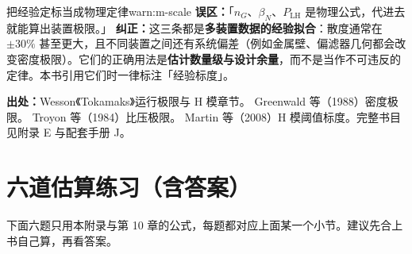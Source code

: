 \begin{warning}{把经验定标当成物理定律}{warn:m-scale}
\textbf{误区：}「$n_G$、$\beta_N$、$P_{\mathrm{LH}}$ 是物理公式，代进去就能算出装置极限。」
\textbf{纠正：}这三条都是\textbf{多装置数据的经验拟合}：散度通常在 $\pm30\%$ 甚至更大，且不同装置之间还有系统偏差（例如金属壁、偏滤器几何都会改变密度极限）。它们的正确用法是\textbf{估计数量级与设计余量}，而不是当作不可违反的定律。本书引用它们时一律标注「经验标度」。
\end{warning}

{\footnotesize
\textbf{出处：}Wesson《Tokamaks》运行极限与 H 模章节。
Greenwald 等（1988）密度极限。
Troyon 等（1984）比压极限。
Martin 等（2008）H 模阈值标度。完整书目见附录 E 与配套手册 J。
}


\section{六道估算练习（含答案）}

下面六题只用本附录与第 10 章的公式，每题都对应上面某一个小节。建议先合上书自己算，再看答案。


